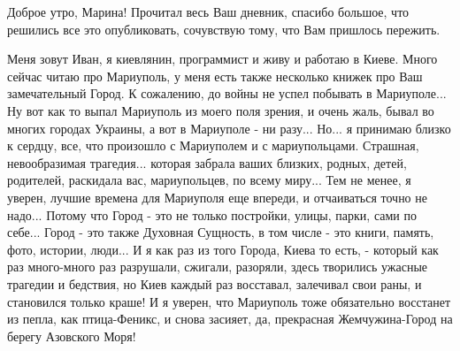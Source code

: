  
 
 
 
 

Доброе утро, Марина! Прочитал весь Ваш дневник, спасибо большое, что решились
все это опубликовать, сочувствую тому, что Вам пришлось пережить.

Меня зовут Иван, я киевлянин, программист и живу и работаю в Киеве. Много
сейчас читаю про Мариуполь, у меня есть также несколько книжек про Ваш
замечательный Город. К сожалению, до войны не успел побывать в Мариуполе... Ну
вот как то выпал Мариуполь из моего поля зрения, и очень жаль, бывал во многих
городах Украины, а вот в Мариуполе - ни разу... Но... я принимаю близко к
сердцу, все, что произошло с Мариуполем и с мариупольцами. Страшная,
невообразимая трагедия...  которая забрала ваших близких, родных, детей,
родителей, раскидала вас, мариупольцев, по всему миру... Тем не менее, я
уверен, лучшие времена для Мариуполя еще впереди, и отчаиваться точно не
надо... Потому что Город - это не только постройки, улицы, парки, сами по
себе... Город - это также Духовная Сущность, в том числе - это книги, память,
фото, истории, люди...  И я как раз из того Города, Киева то есть, - который
как раз много-много раз разрушали, сжигали, разоряли, здесь творились ужасные
трагедии и бедствия, но Киев каждый раз восставал, залечивал свои раны, и
становился только краше! И я уверен, что Мариуполь тоже обязательно восстанет
из пепла, как птица-Феникс, и снова засияет, да, прекрасная Жемчужина-Город на
берегу Азовского Моря!

